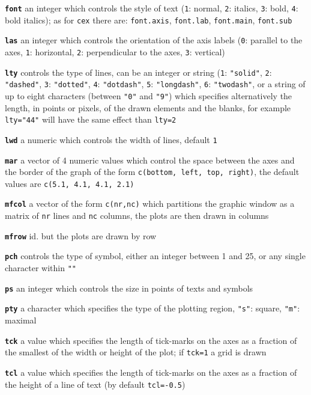 \documentclass[10pt,landscape]{article}
\newcommand{\code}{\texttt}
\newcommand{\bcode}[1]{\texttt{\textbf{#1}}}
\begin{document}
\begin{multicols*}{3}
\bcode{font}  an integer which controls the style of text (\code{1}: normal, \code{2}: italics, \code{3}: bold, \code{4}: bold italics); as for \code{cex} there are: \code{font.axis}, \code{font.lab}, \code{font.main}, \code{font.sub}

\bcode{las}  an integer which controls the orientation of the axis labels (\code{0}: parallel to the axes, \code{1}: horizontal, \code{2}: perpendicular to the axes, \code{3}: vertical)

\bcode{lty}  controls the type of lines, can be an integer or string (\code{1}: \code{"solid"}, \code{2}: \code{"dashed"}, \code{3}: \code{"dotted"}, \code{4}: \code{"dotdash"}, \code{5}: \code{"longdash"}, \code{6}: \code{"twodash"}, or a string of up to eight characters (between \code{"0"} and \code{"9"}) which specifies alternatively the length, in points or pixels, of the drawn elements and the blanks, for example \code{lty="44"} will have the same effect than \code{lty=2}

\bcode{lwd}  a numeric which controls the width of lines, default \code{1}

\bcode{mar}  a vector of 4 numeric values which control the space between the axes and the border of the graph of the form \code{c(bottom, left, top, right)}, the default values are \code{c(5.1, 4.1, 4.1, 2.1)}

\bcode{mfcol}  a vector of the form \code{c(nr,nc)} which partitions the graphic window as a matrix of \code{nr} lines and \code{nc} columns, the plots are then drawn in columns

\bcode{mfrow}  id. but the plots are drawn by row

\bcode{pch}  controls the type of symbol, either an integer between 1
and 25, or any single character within \code{""}


\bcode{ps}  an integer which controls the size in points of texts and symbols

\bcode{pty}  a character which specifies the type of the plotting region, \code{"s"}: square, \code{"m"}: maximal

\bcode{tck}  a value which specifies the length of tick-marks on the axes as a fraction of the smallest of the width or height of the plot; if \code{tck=1} a grid is drawn

\bcode{tcl}  a value which specifies the length of tick-marks on the axes as a fraction of the height of a line of text (by default \code{tcl=-0.5})


\end{multicols*}
\end{document}
